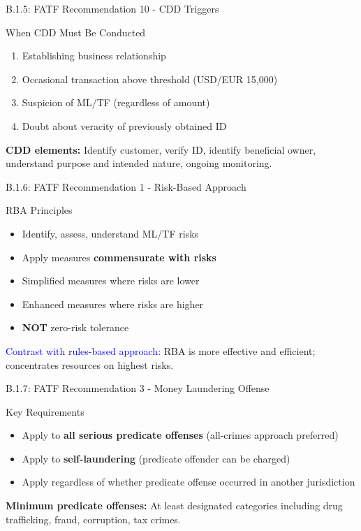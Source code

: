 \documentclass{beamer}
\begin{document}
	\begin{frame}{B.1.5: FATF Recommendation 10 - CDD Triggers}
		\begin{block}{When CDD Must Be Conducted}
			\begin{enumerate}
				\item Establishing business relationship
				\item Occasional transaction above threshold (USD/EUR 15,000)
				\item Suspicion of ML/TF (regardless of amount)
				\item Doubt about veracity of previously obtained ID
			\end{enumerate}
		\end{block}
		\textbf{CDD elements:} Identify customer, verify ID, identify beneficial owner, understand purpose and intended nature, ongoing monitoring.
	\end{frame}
	
	\begin{frame}{B.1.6: FATF Recommendation 1 - Risk-Based Approach}
		\begin{block}{RBA Principles}
			\begin{itemize}
				\item Identify, assess, understand ML/TF risks
				\item Apply measures \textbf{commensurate with risks}
				\item Simplified measures where risks are lower
				\item Enhanced measures where risks are higher
				\item \textbf{NOT} zero-risk tolerance
			\end{itemize}
		\end{block}
		\textcolor{blue}{Contrast with rules-based approach:} RBA is more effective and efficient; concentrates resources on highest risks.
	\end{frame}
	
	\begin{frame}{B.1.7: FATF Recommendation 3 - Money Laundering Offense}
		\begin{block}{Key Requirements}
			\begin{itemize}
				\item Apply to \textbf{all serious predicate offenses} (all-crimes approach preferred)
				\item Apply to \textbf{self-laundering} (predicate offender can be charged)
				\item Apply regardless of whether predicate offense occurred in another jurisdiction
			\end{itemize}
		\end{block}
		\textbf{Minimum predicate offenses:} At least designated categories including drug trafficking, fraud, corruption, tax crimes.
	\end{frame}
	
\end{document}

